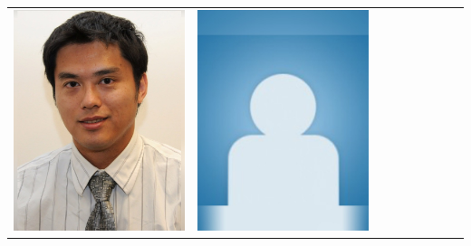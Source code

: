 \documentclass[landscape,a0paper,fontscale=0.292]{baposter}
\begin{document}
\begin{poster}
{\begin{center}
\begin{tabularx}{\linewidth}{X X X X X X X X X}
{\centering \includegraphics[width=0.65\linewidth]{wang.jpg}}&
{\centering \includegraphics[width=0.65\linewidth]{MISSING.jpg}}&

\end{tabularx}
\end{center}}
\end{poster}
\end{document}
